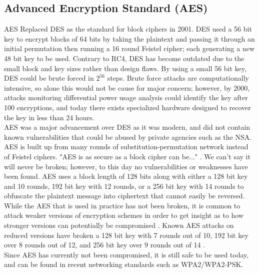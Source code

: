 \documentclass[10pt, titlepage]{article}
\begin{document}
\subsection{Advanced Encryption Standard (AES)}
AES Replaced DES as the standard for block ciphers in 2001. DES used a 56 bit key to encrypt blocks of 64 bits by taking the plaintext and passing it through an initial permutation then running a 16 round Feistel cipher; each generating a new 48 bit key to be used. Contrary to RC4, DES has become outdated due to the small block and key sizes rather than design flaws. By using a small 56 bit key, DES could be brute forced in $2^{56}$ steps. Brute force attacks are computationally intensive, so alone this would not be cause for major concern; however, by 2000, attacks monitoring differential power usage analysis could identify the key after 100 encryptions, and today there exists specialized hardware designed to recover the key in less than 24 hours. \\

AES was a major advancement over DES as it was modern, and did not contain known vulnerabilities that could be abused by private agencies such as the NSA. AES is built up from many rounds of substitution-permutation network instead of Feistel ciphers. "AES is as secure as a block cipher can be..." \cite{appliedCrypto}. We can't say it will never be broken; however, to this day no vulnerabilities or weaknesses have been found. AES uses a block length of 128 bits along with either a 128 bit key and 10 rounds, 192 bit key with 12 rounds, or a 256 bit key with 14 rounds to obfuscate the plaintext message into ciphertext that cannot easily be reversed. \\


While the AES that is used in practice has not been broken, it is common to attack weaker versions of encryption schemes in order to get insight as to how stronger versions can potentially be compromised \cite{appliedCrypto}. Known AES attacks on reduced versions have broken a 128 bit key with 7 rounds out of 10, 192 bit key over 8 rounds out of 12, and 256 bit key over 9 rounds out of 14 \cite{appliedCrypto}. \\

Since AES has currently not been compromised, it is still safe to be used today, and can be found in recent networking standards such as WPA2/WPA2-PSK.
\end{document}
